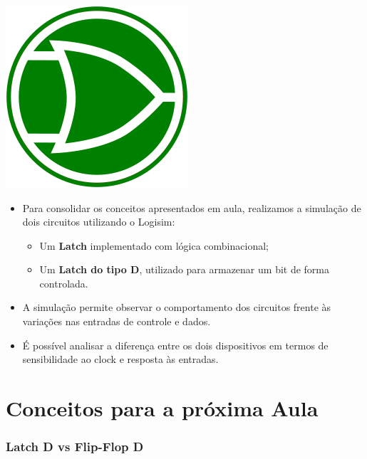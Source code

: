 \documentclass{beamer}
\begin{document}
\begin{frame}
    \frametitle{\insertsection}
    \centering
    \includegraphics[width=0.15\columnwidth]{figures/Logo_Logisim.png}
    
    \vspace{1em}
    
    \begin{itemize}
        \item Para consolidar os conceitos apresentados em aula, realizamos a simulação de dois circuitos utilizando o Logisim:
        \begin{itemize}
            \item Um \textbf{Latch} implementado com lógica combinacional;
            \item Um \textbf{Latch do tipo D}, utilizado para armazenar um bit de forma controlada.
        \end{itemize}
        \item A simulação permite observar o comportamento dos circuitos frente às variações nas entradas de controle e dados.
        \item É possível analisar a diferença entre os dois dispositivos em termos de sensibilidade ao clock e resposta às entradas.
    \end{itemize}
\end{frame}


\section{Conceitos para a próxima Aula}

\begin{frame}
    \frametitle{Latch D vs Flip-Flop D}

    \begin{table}[h!]
    \centering
    \caption{Comparação entre Latch D e Flip-Flop D}
    \label{tab:comparacao_latch_flipflop}
    \end{table}
\end{frame}
\end{document}
